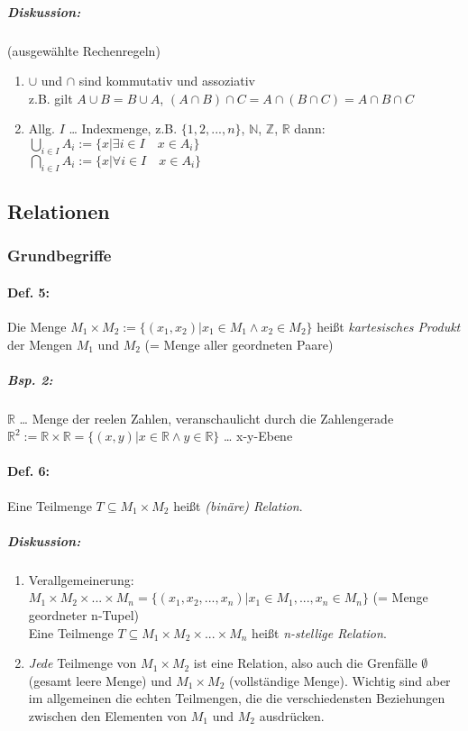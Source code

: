 \subparagraph{Diskussion:} (ausgewählte Rechenregeln)
\begin{enumerate}
\item $\cup$ und $\cap$ sind kommutativ und assoziativ\\
z.B. gilt $A \cup B = B\cup A$, $(A\cap B)\cap C = A \cap (B \cap C) = A \cap B \cap C$
\item Allg. $I$ … Indexmenge, z.B. $\{1,2,...,n\}$, $\mathbb{N}$, $\mathbb{Z}$, $\mathbb{R}$ dann:\\
$\bigcup\limits_{i\in I}A_i := \{x| \exists i \in I \quad x \in A_i\}$\\
$\bigcap\limits_{i\in I}A_i := \{x| \forall i \in I \quad x \in A_i\}$
\end{enumerate}

\subsection{Relationen}

\subsubsection{Grundbegriffe}

\paragraph{Def. 5:} \parskp
Die Menge $M_1 \times M_2 := \{ (x_1,x_2) | x_1 \in M_1 \wedge x_2 \in M_2\}$ heißt \emph{kartesisches Produkt} der Mengen $M_1$ und $M_2$ (= Menge aller geordneten Paare)

\subparagraph{Bsp. 2:} \parskp
$\mathbb{R}$ … Menge der reelen Zahlen, veranschaulicht durch die Zahlengerade\\
$\mathbb{R}^2 := \mathbb{R} \times \mathbb{R} = \{ (x,y) | x \in \mathbb{R} \wedge y \in \mathbb{R}\}$ … x-y-Ebene

\paragraph{Def. 6:} \parskp
Eine Teilmenge $T \subseteq M_1 \times M_2$ heißt \emph{(binäre) Relation}.

\subparagraph{Diskussion:}
\begin{enumerate}
\item Verallgemeinerung: $M_1 \times M_2 \times ... \times M_n= \{ (x_1, x_2, ..., x_n) | x_1 \in M_1, ..., x_n \in M_n\}$
(= Menge geordneter n-Tupel)\\
Eine Teilmenge $T\subseteq M_1 \times M_2 \times ... \times M_n$ heißt \emph{n-stellige Relation}.
\item \emph{Jede} Teilmenge von $M_1\times M_2$ ist eine Relation, also auch die Grenfälle $\emptyset$ (gesamt leere Menge) und $M_1\times M_2$ (vollständige Menge). Wichtig sind aber im allgemeinen die echten Teilmengen, die die verschiedensten Beziehungen zwischen den Elementen von $M_1$ und $M_2$ ausdrücken.
\end{enumerate}

